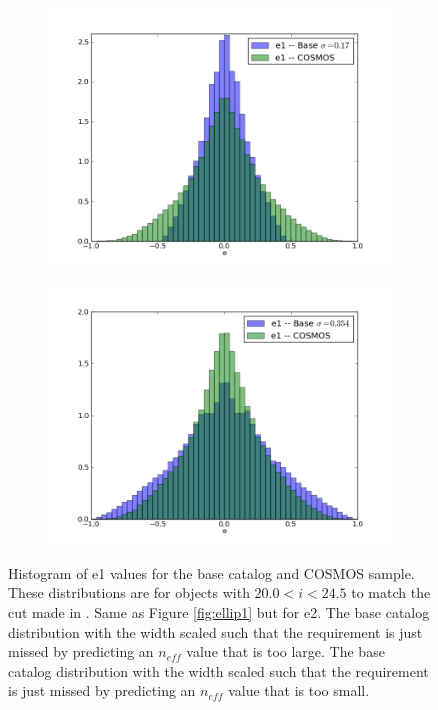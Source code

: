 \documentclass[]{article}
\begin{document}
\begin{figure}[H]
        \begin{subfigure}[b]{0.3\textwidth}
              \centering
              \includegraphics[width=\textwidth]{validation_figures/e1_hist_s_17.png}
              \label{fig:ellip_errbig}
     \end{subfigure}
     \begin{subfigure}[b]{0.3\textwidth}
             \centering
             \includegraphics[width=\textwidth]{validation_figures/e1_hist_s_354.png}
            \label{fig:ellip_errbig}
     \end{subfigure}

\caption{Histogram of e1 values for the base catalog and COSMOS sample.  These distributions are for objects with $20.0 < i < 24.5$ to match
the cut made in \citet{chang}.
Same as Figure \ref{fig:ellip1} but for e2.
The base catalog distribution with the width scaled such that the requirement is just missed by predicting an $n_{eff}$ value that is too large.
The base catalog distribution with the width scaled such that the requirement is just missed by predicting an $n_{eff}$ value that is too small.}
\end{figure}
\end{document}
